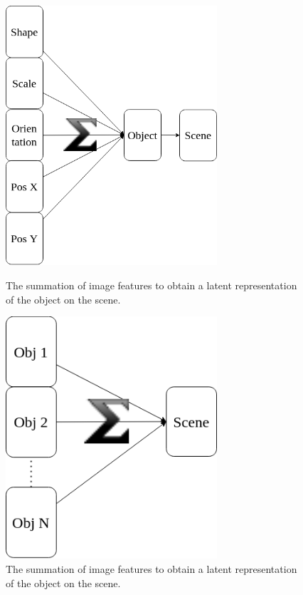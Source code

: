 \documentclass{article}
\begin{document}
    \begin{figure}[ht]{\linewidth}
        \begin{minipage}[b]{0.48\textwidth}
            \centering
            \includegraphics[width=0.7\textwidth]{img/model/sum_features_to_scene}
            \caption{The summation of image features to obtain a latent representation of the object on the scene.}
            \label{fig:sum_features_to_scene}
        \end{minipage}\hfill
        \begin{minipage}[b]{0.48\textwidth}
            \centering
            \includegraphics[width=0.7\textwidth]{img/model/sum_objects_to_scene}
            \caption{The summation of image features to obtain a latent representation of the object on the scene.}
            \label{fig:sum_objects_to_scene}
        \end{minipage}
    \end{figure}
\end{document}
